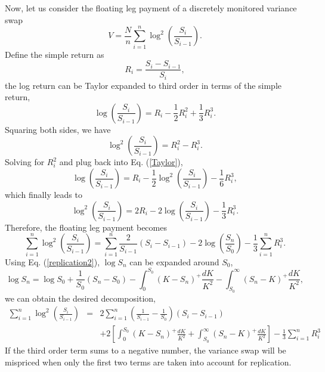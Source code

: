 \documentclass[12pt]{article}
\begin{document}
    Now, let us consider the floating leg payment of a discretely monitored variance swap \cite{CarrLee}
    \begin{equation}
      V = \frac{N}{n}\sum_{i=1}^n\log^2\left(\frac{S_i}{S_{i-1}}\right).
    \end{equation}
    Define the simple return as
    \begin{equation}
      R_i=\frac{S_i-S_{i-1}}{S_i},
    \end{equation}
    the log return can be Taylor expanded to third order in terms of the simple return,
    \begin{equation}
      \log\left(\frac{S_i}{S_{i-1}}\right)=R_i-\frac{1}{2}R_i^2+\frac{1}{3}R_i^3.
      \label{Taylor}
    \end{equation}
    Squaring both sides, we have
    \begin{equation}
      \log^2\left(\frac{S_i}{S_{i-1}}\right)=R_i^2-R_i^3.
    \end{equation}
    Solving for $R_i^2$ and plug back into Eq. (\ref{Taylor}),
    \begin{equation}
      \log\left(\frac{S_i}{S_{i-1}}\right)=R_i-\frac{1}{2}\log^2\left(\frac{S_i}{S_{i-1}}\right)-\frac{1}{6}R_i^3,
    \end{equation}
    which finally leads to
    \begin{equation}
      \log^2\left(\frac{S_i}{S_{i-1}}\right)=2R_i-2\log\left(\frac{S_i}{S_{i-1}}\right)-\frac{1}{3}R_i^3.
    \end{equation}
    Therefore, the floating leg payment becomes
    \begin{equation}
      \sum_{i=1}^n\log^2\left(\frac{S_i}{S_{i-1}}\right)=\sum_{i=1}^n\frac{2}{S_{i-1}}(S_i-S_{i-1})-2\log\left(\frac{S_n}{S_0}\right)-\frac{1}{3}\sum_{i=1}^nR_i^3.
    \end{equation}
    Using Eq. (\ref{replication2}), $\log S_n$ can be expanded around $S_0$,
    \begin{equation}
      \log S_n = \log S_0 +\frac{1}{S_0}\left(S_n-S_0\right)-\int_0^{S_0}\left(K-S_n\right)^+\frac{dK}{K^2}-\int_{S_0}^{\infty}\left(S_n-K\right)^+\frac{dK}{K^2},
    \end{equation}
    we can obtain the desired decomposition,
    \begin{eqnarray}
      \sum_{i=1}^n\log^2\left(\frac{S_i}{S_{i-1}}\right)&=&2\sum_{i=1}^n\left(\frac{1}{S_{i-1}}-\frac{1}{S_0}\right)(S_i-S_{i-1})\nonumber\\
          && + 2\left[\int_0^{S_0}\left(K-S_n\right)^+\frac{dK}{K^2}+\int_{S_0}^{\infty}\left(S_n-K\right)^+\frac{dK}{K^2}\right]-\frac{1}{3}\sum_{i=1}^nR_i^3
    \end{eqnarray}
    If the third order term sums to a negative number, the variance swap will be mispriced when only the first two terms are
    taken into account for replication.
\end{document}
